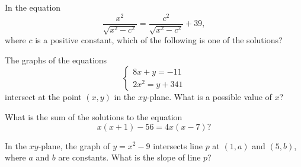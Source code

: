 \vspace{0.75em}


\vspace{2em}

\noindent\markforreview
\vspace{1em}

In the equation  
\[
\frac{x^2}{\sqrt{x^2 - c^2}} = \frac{c^2}{\sqrt{x^2 - c^2}} + 39,
\]  
where \(c\) is a positive constant, which of the following is one of the solutions?

\vspace{0.75em}





\newpage


\noindent\markforreview
\vspace{1em}

The graphs of the equations  
\[
\begin{cases}
8x + y = -11 \\
2x^2 = y + 341
\end{cases}
\]  
intersect at the point \((x, y)\) in the \(xy\)-plane. What is a possible value of \(x\)?

\vspace{0.75em}


\vspace{2em}

\noindent\markforreview
\vspace{1em}

What is the sum of the solutions to the equation  
\[
x(x + 1) - 56 = 4x(x - 7)?
\]

\vspace{0.75em}

\newpage

\noindent\markforreview
\vspace{1em}

In the \(xy\)-plane, the graph of \(y = x^2 - 9\) intersects line \(p\) at \((1, a)\) and \((5, b)\),  
where \(a\) and \(b\) are constants. What is the slope of line \(p\)?

\vspace{0.75em}


